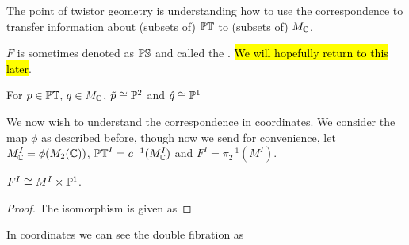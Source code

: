\documentclass{article}
\begin{document}
\begin{idea}
	The point of twistor geometry is understanding how to use the correspondence
	to transfer information about (subsets of) $\mathbb{PT}$ to (subsets of) $M_{\mathbb{C}}$. 
\end{idea}

\begin{remark}
	$F$ is sometimes denoted as $\mathbb{PS}$ and called the . \hl{We will hopefully return to this later}. 
\end{remark}

\begin{prop}\label{prop:twistor correspondence shape}
	For $p \in \mathbb{PT}, \, q \in M_{\mathbb{C}}$, $\tilde{p} \cong \mathbb{P}^2$ and $\hat{q} \cong \mathbb{P}^1$
\end{prop}

We now wish to understand the correspondence in coordinates. We consider the map $\phi$ as described before, though now we send 
for convenience, let $M^I_{\mathbb{C}}= \phi(M_2(\mathbb{C}))$, $\mathbb{PT}^I = c^{-1}(M_{\mathbb{C}}^I)$ and $F^I = \pi_2^{-1}(M^I)$.  
\begin{prop}
	$F^I \cong M^I \times \mathbb{P}^1$. 
\end{prop} 
\begin{proof}
	The isomorphism is given as 
\end{proof}
\begin{corollary}
	In coordinates we can see the double fibration as 
\end{corollary}
\end{document}
